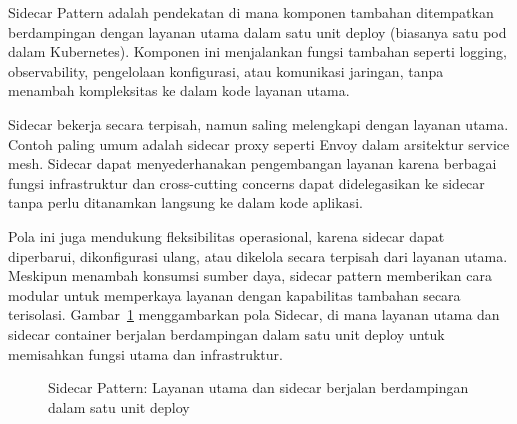 Sidecar Pattern adalah pendekatan di mana komponen tambahan ditempatkan berdampingan dengan layanan utama dalam satu unit deploy (biasanya satu pod dalam Kubernetes). Komponen ini menjalankan fungsi tambahan seperti logging, observability, pengelolaan konfigurasi, atau komunikasi jaringan, tanpa menambah kompleksitas ke dalam kode layanan utama.

Sidecar bekerja secara terpisah, namun saling melengkapi dengan layanan utama. Contoh paling umum adalah sidecar proxy seperti Envoy dalam arsitektur service mesh. Sidecar dapat menyederhanakan pengembangan layanan karena berbagai fungsi infrastruktur dan cross-cutting concerns dapat didelegasikan ke sidecar tanpa perlu ditanamkan langsung ke dalam kode aplikasi.

Pola ini juga mendukung fleksibilitas operasional, karena sidecar dapat diperbarui, dikonfigurasi ulang, atau dikelola secara terpisah dari layanan utama. Meskipun menambah konsumsi sumber daya, sidecar pattern memberikan cara modular untuk memperkaya layanan dengan kapabilitas tambahan secara terisolasi. Gambar~\ref{fig:sidecar-pattern} menggambarkan pola Sidecar, di mana layanan utama dan sidecar container berjalan berdampingan dalam satu unit deploy untuk memisahkan fungsi utama dan infrastruktur.

\begin{figure}[h]
	\centering
	\caption{Sidecar Pattern: Layanan utama dan sidecar berjalan berdampingan dalam satu unit deploy}
	\vspace{0.5em}
	\label{fig:sidecar-pattern}
\end{figure}


